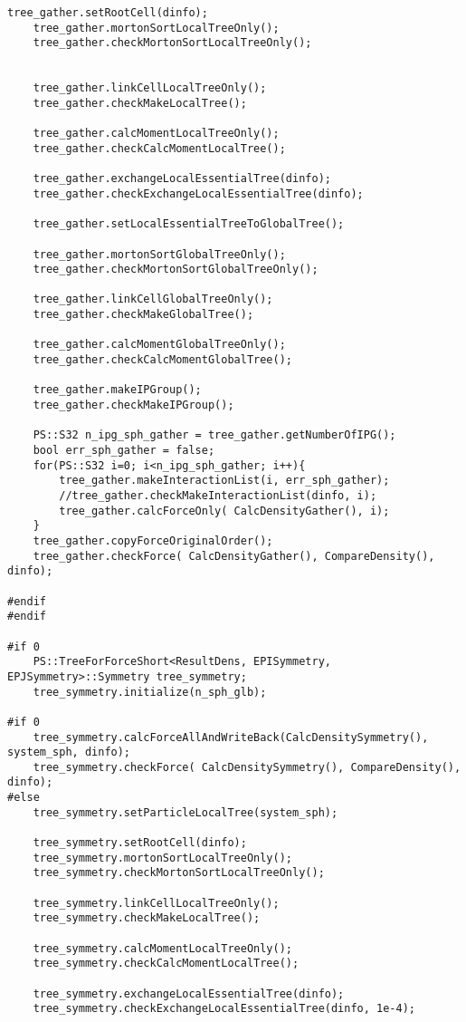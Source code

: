 \begin{lstlisting}[caption=開放境界、モートンソート、ローカルツリー構築、モーメント計算、LET交換、グローバルツリー構築、相互作用計算のテスト]
    tree_gather.setRootCell(dinfo);
    tree_gather.mortonSortLocalTreeOnly();
    tree_gather.checkMortonSortLocalTreeOnly();


    tree_gather.linkCellLocalTreeOnly();
    tree_gather.checkMakeLocalTree();

    tree_gather.calcMomentLocalTreeOnly();
    tree_gather.checkCalcMomentLocalTree();

    tree_gather.exchangeLocalEssentialTree(dinfo);
    tree_gather.checkExchangeLocalEssentialTree(dinfo);

    tree_gather.setLocalEssentialTreeToGlobalTree();

    tree_gather.mortonSortGlobalTreeOnly();
    tree_gather.checkMortonSortGlobalTreeOnly();

    tree_gather.linkCellGlobalTreeOnly();
    tree_gather.checkMakeGlobalTree();

    tree_gather.calcMomentGlobalTreeOnly();
    tree_gather.checkCalcMomentGlobalTree();

    tree_gather.makeIPGroup();
    tree_gather.checkMakeIPGroup();

    PS::S32 n_ipg_sph_gather = tree_gather.getNumberOfIPG();
    bool err_sph_gather = false;
    for(PS::S32 i=0; i<n_ipg_sph_gather; i++){
        tree_gather.makeInteractionList(i, err_sph_gather);
        //tree_gather.checkMakeInteractionList(dinfo, i);
        tree_gather.calcForceOnly( CalcDensityGather(), i);
    }
    tree_gather.copyForceOriginalOrder();
    tree_gather.checkForce( CalcDensityGather(), CompareDensity(), dinfo);

#endif
#endif

#if 0
    PS::TreeForForceShort<ResultDens, EPISymmetry, EPJSymmetry>::Symmetry tree_symmetry;
    tree_symmetry.initialize(n_sph_glb);

#if 0
    tree_symmetry.calcForceAllAndWriteBack(CalcDensitySymmetry(), system_sph, dinfo);
    tree_symmetry.checkForce( CalcDensitySymmetry(), CompareDensity(), dinfo);
#else
    tree_symmetry.setParticleLocalTree(system_sph);

    tree_symmetry.setRootCell(dinfo);
    tree_symmetry.mortonSortLocalTreeOnly();
    tree_symmetry.checkMortonSortLocalTreeOnly();

    tree_symmetry.linkCellLocalTreeOnly();
    tree_symmetry.checkMakeLocalTree();

    tree_symmetry.calcMomentLocalTreeOnly();
    tree_symmetry.checkCalcMomentLocalTree();

    tree_symmetry.exchangeLocalEssentialTree(dinfo);
    tree_symmetry.checkExchangeLocalEssentialTree(dinfo, 1e-4);



\end{lstlisting}
